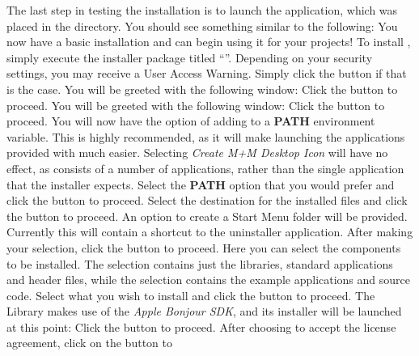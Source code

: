 The last step in testing the \mplusm{} installation is to launch the \emph{\CMU}
application, which was placed in the 
directory.
You should see something similar to the following:
You now have a basic \mplusm{} installation and can begin using it for your projects!
\tertiaryEnd
\secondaryEnd
\condPage
{}
To install \mplusm, simply execute the installer package titled
``''.
Depending on your security settings, you may receive a User Access Warning.
Simply click the  button if that is the case.
You will be greeted with the following window:
Click the  button to proceed.
You will be greeted with the following window:
Click the  button to proceed.
\condPage{}
You will now have the option of adding \mplusm{} to a \textbf{PATH} environment variable.
This is highly recommended, as it will make launching the applications provided with
\mplusm{} much easier.
Selecting \emph{Create M+M Desktop Icon} will have no effect, as \mplusm{} consists of a
number of applications, rather than the single application that the installer expects.
Select the \textbf{PATH} option that you would prefer and click the 
button to proceed.
Select the destination for the installed files and click the  button to
proceed.
\condPage
{}
An option to create a Start Menu folder will be provided.
Currently this will contain a shortcut to the uninstaller application.
After making your selection, click the  button to proceed.
Here you can select the components to be installed.
The  selection contains just the libraries, standard applications and
header files, while the  selection contains the example applications
and source code.
Select what you wish to install and click the  button to proceed.
\condPage{}
The \mplusm{} Library makes use of the \emph{Apple Bonjour SDK}, and its installer will be
launched at this point:
Click the  button to proceed.
After choosing to accept the license agreement, click on the  button to

